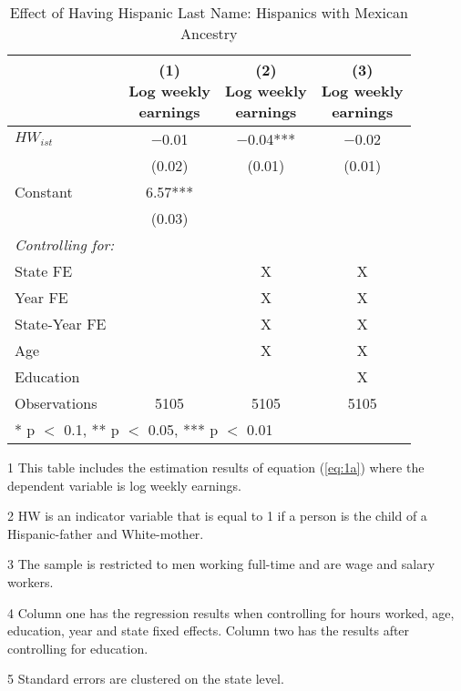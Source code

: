 \begin{table}[H]
\centering\centering
\caption{Effect of Having Hispanic Last Name: Hispanics with Mexican Ancestry  \label{tab:lastnamereg-weekearm-mex}}
\centering
\begin{threeparttable}
\begin{tabular}[t]{lccc}
\toprule
  & \specialcell{(1) \\ Log weekly \\ earnings} & \specialcell{(2) \\ Log weekly \\ earnings} & \specialcell{(3) \\  Log weekly \\ earnings}\\
\midrule
$HW_{ist}$ & \num{-0.01} & \num{-0.04}*** & \num{-0.02}\\
 & (\num{0.02}) & (\num{0.01}) & (\num{0.01})\\
Constant & \num{6.57}*** &  & \\
 & (\num{0.03}) &  & \\
\midrule
\textit{Controlling for:} &  &  & \\
State FE &  & X & X\\
Year FE &  & X & X\\
State-Year FE &  & X & X\\
Age &  & X & X\\
Education &  &  & X\\
Observations & \num{5105} & \num{5105} & \num{5105}\\
\bottomrule
\multicolumn{4}{l}{\rule{0pt}{1em}* p $<$ 0.1, ** p $<$ 0.05, *** p $<$ 0.01}\\
\end{tabular}
\begin{tablenotes}
\item[1] {\footnotesize{This table includes the estimation results of equation (\ref{eq:1a}) where the dependent variable is log weekly earnings.}}
\item[2] {\footnotesize{HW is an indicator variable that is equal to 1 if a person is the child of a Hispanic-father and White-mother.}}
\item[3] {\footnotesize{The sample is restricted to men working full-time and are wage and salary workers.}}
\item[4] {\footnotesize{Column one has the regression results when controlling for hours worked, age, education, year and state fixed effects. Column two has the results after controlling for education.}}
\item[5] {\footnotesize{Standard errors are clustered on the state level.}}
\end{tablenotes}
\end{threeparttable}
\end{table}
